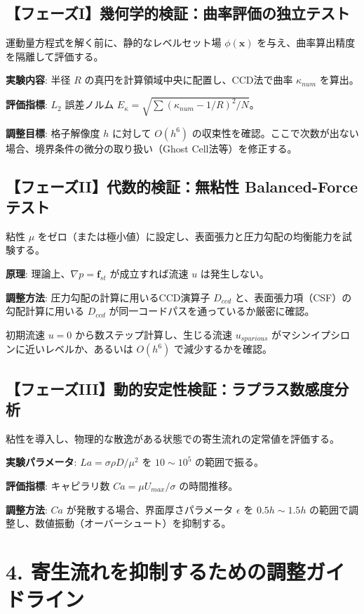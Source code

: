 \documentclass[12pt, a4paper, titlepage, xelatex, ja=standard, jafont=hiragino-pron, twoside]{bxjsarticle}
\begin{document}
\subsection*{【フェーズI】幾何学的検証：曲率評価の独立テスト}
運動量方程式を解く前に、静的なレベルセット場 $\phi(\mathbf{x})$ を与え、曲率算出精度を隔離して評価する。

\textbf{実験内容}: 半径 $R$ の真円を計算領域中央に配置し、CCD法で曲率 $\kappa_{num}$ を算出。

\textbf{評価指標}: $L_2$ 誤差ノルム $E_\kappa = \sqrt{\sum (\kappa_{num} - 1/R)^2 / N}$。

\textbf{調整目標}: 格子解像度 $h$ に対して $O(h^6)$ の収束性を確認。ここで次数が出ない場合、境界条件の微分の取り扱い（Ghost Cell法等）を修正する。

\subsection*{【フェーズII】代数的検証：無粘性 Balanced-Force テスト}
粘性 $\mu$ をゼロ（または極小値）に設定し、表面張力と圧力勾配の均衡能力を試験する。

\textbf{原理}: 理論上、$\nabla p = \mathbf{f}_{st}$ が成立すれば流速 $u$ は発生しない。

\textbf{調整方法}: 圧力勾配の計算に用いるCCD演算子 $D_{ccd}$ と、表面張力項（CSF）の勾配計算に用いる $D_{ccd}$ が同一コードパスを通っているか厳密に確認。

初期流速 $u=0$ から数ステップ計算し、生じる流速 $u_{spurious}$ がマシンイプシロンに近いレベルか、あるいは $O(h^6)$ で減少するかを確認。

\subsection*{【フェーズIII】動的安定性検証：ラプラス数感度分析}
粘性を導入し、物理的な散逸がある状態での寄生流れの定常値を評価する。

\textbf{実験パラメータ}: $La = \sigma \rho D / \mu^2$ を $10 \sim 10^5$ の範囲で振る。

\textbf{評価指標}: キャピラリ数 $Ca = \mu U_{max} / \sigma$ の時間推移。

\textbf{調整方法}: $Ca$ が発散する場合、界面厚さパラメータ $\epsilon$ を $0.5h \sim 1.5h$ の範囲で調整し、数値振動（オーバーシュート）を抑制する。

\section*{4. 寄生流れを抑制するための調整ガイドライン}
\end{document}
